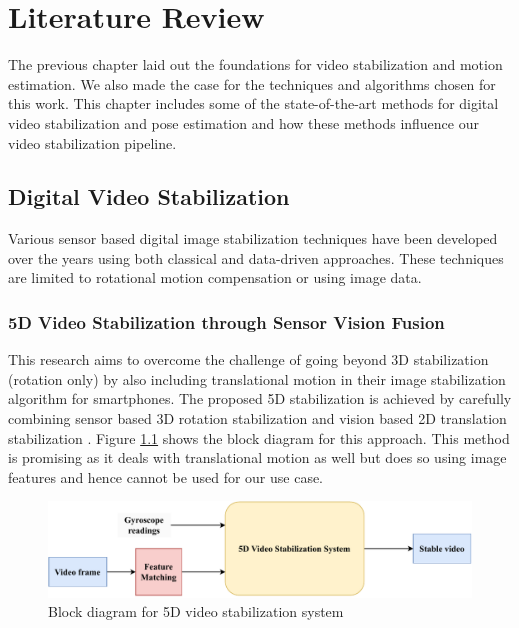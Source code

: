 \chapter{Literature Review} \label{chapter_three}

The previous chapter laid out the foundations for video stabilization and motion estimation. We also made the case for the techniques and algorithms chosen for this work. This chapter includes some of the state-of-the-art methods for digital video stabilization and pose estimation and how these methods influence our video stabilization pipeline.

\section{Digital Video Stabilization}
Various sensor based digital image stabilization techniques have been developed over the years using both classical and data-driven approaches. These techniques are limited to rotational motion compensation or using image data.

\subsection{5D Video Stabilization through Sensor Vision Fusion}
This research aims to overcome the challenge of going beyond 3D stabilization (rotation only) by also including translational motion in their image stabilization algorithm for smartphones. The proposed 5D stabilization is achieved by carefully combining sensor based 3D rotation stabilization and vision based 2D translation stabilization \citep{zhuang20195d}. Figure \ref{fig:5d_stab} shows the block diagram for this approach. This method is promising as it deals with translational motion as well but does so using image features and hence cannot be used for our use case.

\begin{figure}[H]
    \centering
    \includegraphics[scale=0.65]{images/fig_chapter3/5d_stab.pdf}
    \caption{Block diagram for 5D video stabilization system} 
    \label{fig:5d_stab}
\end{figure}


